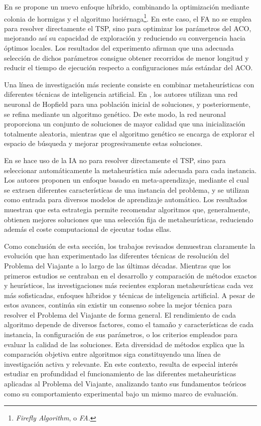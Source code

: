 En \cite{xu2023} se propone un nuevo enfoque híbrido, combinando la optimización mediante colonia de hormigas y el algoritmo 
luciérnaga\footnote{\textit{Firefly Algorithm}, o \textit{FA}.}. En este caso, el FA no se emplea para resolver directamente 
el TSP, sino para optimizar los parámetros del ACO, mejorando así su capacidad de exploración y reduciendo su convergencia 
hacia óptimos locales. Los resultados del experimento afirman que una adecuada selección de dichos parámetros consigue 
obtener recorridos de menor longitud y reducir el tiempo de ejecución respecto a configuraciones más estándar del ACO.

Una línea de investigación más reciente consiste en combinar metaheurísticas con diferentes técnicas de inteligencia 
artificial. En \cite{vahdati2010}, los autores utilizan una red neuronal de Hopfield \cite{wen2009} para una población inicial de 
soluciones, y posteriormente, se refina mediante un algoritmo genético. De este modo, la red neuronal proporciona un conjunto
de soluciones de mayor calidad que una inicialización totalmente aleatoria, mientras que el algoritmo genético se encarga de
explorar el espacio de búsqueda y mejorar progresivamente estas soluciones.

En \cite{kanda2016} se hace uso de la IA no para resolver directamente el TSP, sino para seleccionar automáticamente la
metaheurística más adecuada para cada instancia. Los autores proponen un enfoque basado en meta-aprendizaje, mediante el 
cual se extraen diferentes características de una instancia del problema, y se utilizan como entrada para diversos 
modelos de aprendizaje automático. Los resultados muestran que esta estrategia permite recomendar algoritmos que, 
generalmente, obtienen mejores soluciones que una selección fija de metaheurísticas, reduciendo además el coste 
computacional de ejecutar todas ellas.

Como conclusión de esta sección, los trabajos revisados demuestran claramente la evolución que han experimentado las 
diferentes técnicas de resolución del Problema del Viajante a lo largo de las últimas décadas. Mientras que los primeros 
estudios se centraban en el desarrollo y comparación de métodos exactos y heurísticos, las investigaciones más recientes 
exploran metaheurísticas cada vez más sofisticadas, enfoques híbridos y técnicas de inteligencia artificial. A pesar de 
estos avances, continúa sin existir un consenso sobre la mejor técnica para resolver el Problema del Viajante de forma 
general. El rendimiento de cada algoritmo depende de diversos factores, como el tamaño y características de cada instancia, 
la configuración de sus parámetros, o los criterios empleados para evaluar la calidad de las soluciones. Esta diversidad 
de métodos explica que la comparación objetiva entre algoritmos siga constituyendo una línea de investigación activa y 
relevante. En este contexto, resulta de especial interés estudiar en profundidad el funcionamiento de las diferentes 
metaheurísticas aplicadas al Problema del Viajante, analizando tanto sus fundamentos teóricos como su comportamiento 
experimental bajo un mismo marco de evaluación.

